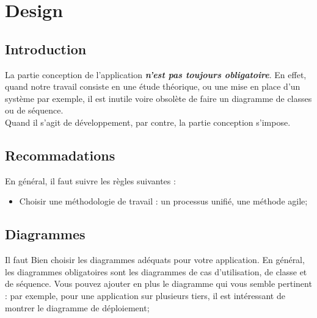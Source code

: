 
\setcounter{chapter}{1}
\chapter{Design}
\graphicspath{{Chapitre2/figures/}}


\pagestyle{fancy}
\fancyhf{}
\fancyhead[R]{\bfseries\rightmark}
\fancyfoot[R]{\thepage}
\renewcommand{\headrulewidth}{0.5pt}
\renewcommand{\footrulewidth}{0pt}
\renewcommand{\chaptermark}[1]{\markboth{\MakeUppercase{\chaptername~\thechapter. #1 }}{}}
\renewcommand{\sectionmark}[1]{\markright{\thechapter.\thesection~ #1}}

\begin{spacing}{1.2}
\section*{Introduction}
La partie conception de l'application \textbf{\textsl{n'est pas toujours obligatoire}}. En effet, quand notre travail consiste en une étude théorique, ou une mise en place d'un système par exemple, 
il est inutile voire obsolète de faire un diagramme de classes ou de séquence.\\
Quand il s'agit de développement, par contre, la partie conception s'impose. 
\section{Recommadations}
En général, 
il faut suivre les règles suivantes :
\begin{itemize}
	\item Choisir une méthodologie de travail : un processus unifié, une méthode agile;
\end{itemize}
\section{Diagrammes}
Il faut Bien choisir les diagrammes adéquats pour votre application. En général, les
diagrammes obligatoires sont les diagrammes de cas d'utilisation, de classe et de 
séquence. Vous pouvez ajouter en plus le diagramme qui vous semble pertinent :
par exemple, pour une application sur plusieurs tiers, il est intéressant de
montrer le diagramme de déploiement;
\begin{itemize}


\end{itemize}
\end{spacing}
